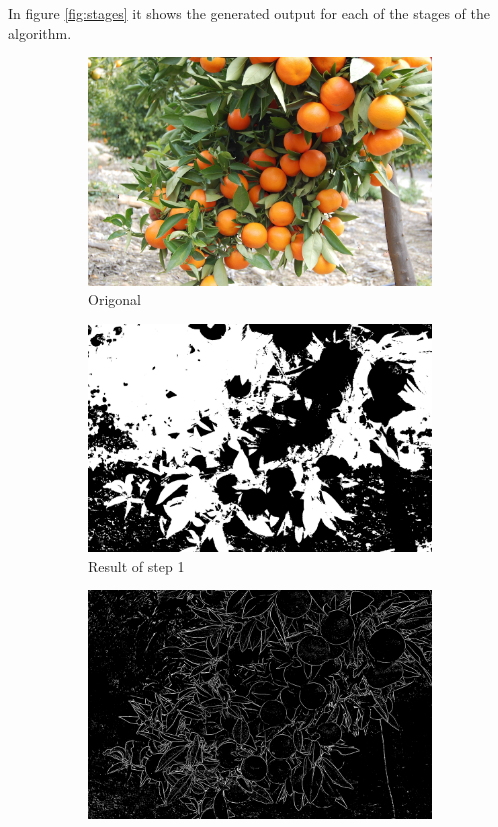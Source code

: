 \documentclass[conference]{IEEEtran}
\begin{document}
In figure \ref{fig:stages} it shows the generated output for each of the stages of the algorithm. 


\begin{figure}[H]
  \begin{subfigure}{.3\linewidth}
 	 \includegraphics[width=\linewidth]{citrus1/citrus1_orig.jpg}\hfill
	 \caption{Origonal}
  \end{subfigure}
  \begin{subfigure}{.3\linewidth}
  	\includegraphics[width=\linewidth]{citrus1/citrus1_NDI.jpg}\hfill
   	\caption{Result of step 1}
  \end{subfigure}
  \begin{subfigure}{.3\linewidth}
  	\includegraphics[width=\linewidth]{citrus1/citrus1_mean.jpg}

\end{subfigure}
\end{figure}
\end{document}
